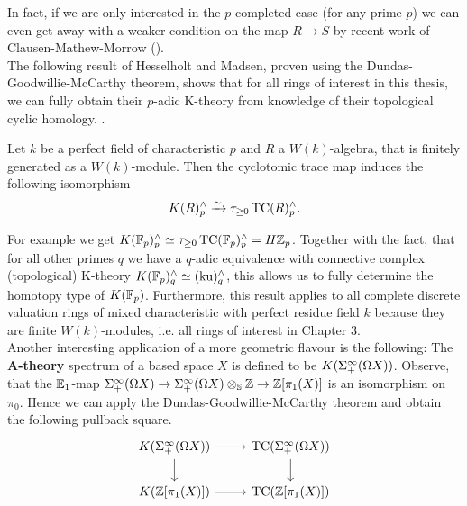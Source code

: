 In fact, if we are only interested in the $p$-completed case (for any prime $p$) we can even get away with a weaker condition on the map $R\to S$ by recent work of Clausen-Mathew-Morrow (\cite[Theorem~A]{CMMHenselian}).\\
The following result of Hesselholt and Madsen, proven using the Dundas-Goodwillie-McCarthy theorem, shows that for all rings of interest in this thesis, we can fully obtain their $p$-adic K-theory from knowledge of their topological cyclic homology.  
. 
\begin{thm}\cite[Theorem~D]{HMWV}
    Let $k$ be a perfect field of characteristic $p$ and $R$ a $W(k)$-algebra, that is finitely generated as a $W(k)$-module. Then the cyclotomic trace map induces the following isomorphism
    \begin{align*}
        K(R)_p^{\wedge}\xrightarrow{\sim} \tau_{\geq 0}\operatorname{TC}(R)_p^{\wedge}.
    \end{align*}
\end{thm}
For example we get $K(\mathbb{F}_p)_p^{\wedge}\simeq \tau_{\geq 0}\operatorname{TC}(\mathbb{F}_p)_p^{\wedge}=H\mathbb{Z}_p$. Together with the fact, that for all other primes $q$ we have a $q$-adic equivalence with connective complex (topological) K-theory $K(\mathbb{F}_p)_q^{\wedge}\simeq (\mathrm{ku})_q^{\wedge}$, this allows us to fully determine the homotopy type of $K(\mathbb{F}_p)$. 
Furthermore, this result applies to all complete discrete valuation rings of mixed characteristic with perfect residue field $k$ because they are finite $W(k)$-modules, i.e. all rings of interest in Chapter 3. \\
Another interesting application of a more geometric flavour is the following: The \textbf{A-theory} spectrum of a based space $X$ is defined to be $K(\Sigma^{\infty}_{+}(\Omega X))$. Observe, that the $\mathbb{E}_1$-map $\Sigma^{\infty}_{+}(\Omega X)\rightarrow \Sigma^{\infty}_{+}(\Omega X)\otimes_{\mathbb{S}}\mathbb{Z}\rightarrow \mathbb{Z}[\pi_1(X)]$ is an isomorphism on $\pi_0$. Hence we can apply the Dundas-Goodwillie-McCarthy theorem and obtain the following pullback square.
\[\begin{tikzcd}
	{K(\Sigma^\infty_+(\Omega X))} & {\mathrm{TC}(\Sigma^\infty_+(\Omega X))} \\
	{K(\mathbb{Z}[\pi_1(X)])} & {\mathrm{TC}(\mathbb{Z}[\pi_1(X)])}
	\arrow[from=1-1, to=1-2]
	\arrow[from=1-2, to=2-2]
	\arrow[from=1-1, to=2-1]
	\arrow[from=2-1, to=2-2]
\end{tikzcd}\]
